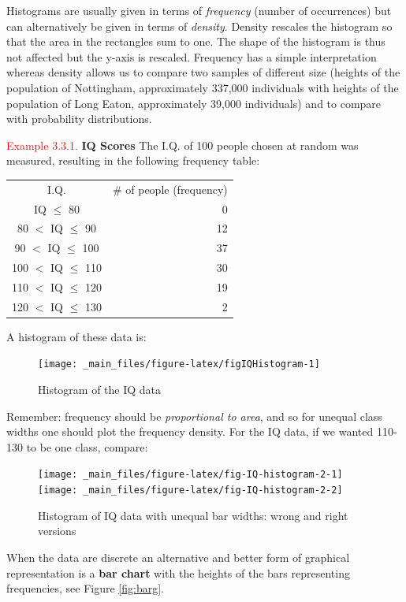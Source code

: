 \documentclass[
]{book}
\begin{document}
Histograms are usually given in terms of \emph{frequency} (number of occurrences) but can alternatively be given in terms of \emph{density}. Density rescales the histogram so that the area in the rectangles sum to one. The shape of the histogram is thus not affected but the y-axis is rescaled. Frequency has a simple interpretation whereas density allows us to compare two samples of different size (heights of the population of Nottingham, approximately 337,000 individuals with heights of the population of Long Eaton, approximately 39,000 individuals) and to compare with probability distributions.

\leavevmode{}%
\textcolor{red}{Example 3.3.1.}
{ \textbf{IQ Scores} } The I.Q. of 100 people chosen at random was
measured, resulting in the following frequency table:

\begin{longtable}[]{@{}cr@{}}
\toprule\noalign{}
\endhead
\bottomrule\noalign{}
\endlastfoot
I.Q. & \# of people (frequency) \\
IQ \(\leq\) 80 & 0 \\
80 \(<\) IQ \(\leq\) 90 & 12 \\
90 \(<\) IQ \(\leq\) 100 & 37 \\
100 \(<\) IQ \(\leq\) 110 & 30 \\
110 \(<\) IQ \(\leq\) 120 & 19 \\
120 \(<\) IQ \(\leq\) 130 & 2 \\
\end{longtable}

A histogram of these data is:

\begin{figure}
\texttt{[image: \_main\_files/figure-latex/figIQHistogram-1]} \caption{Histogram of the IQ data}\label{fig:figIQHistogram}
\end{figure}

Remember: frequency should be \emph{proportional to area}, and so for unequal
class widths one should plot the frequency density. For the IQ data, if we wanted 110-130 to be one class, compare:

\begin{figure}
\texttt{[image: \_main\_files/figure-latex/fig-IQ-histogram-2-1]} \texttt{[image: \_main\_files/figure-latex/fig-IQ-histogram-2-2]} \caption{Histogram of IQ data with unequal bar widths: wrong and right versions}\label{fig:fig-IQ-histogram-2}
\end{figure}

When the data are discrete an alternative and better form of
graphical representation is a \textbf{bar chart} with the heights of the bars
representing frequencies, see Figure \ref{fig:barg}.
\end{document}
